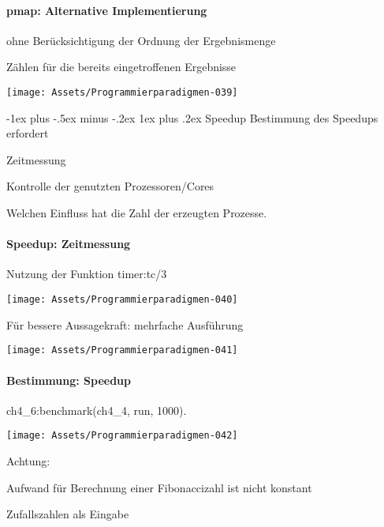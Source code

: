 \documentclass[10pt]{article}
\makeatletter
\renewcommand{\subsubsection}{\@startsection{subsubsection}{3}{0mm}%
                                {-1ex plus -.5ex minus -.2ex}%
                                {1ex plus .2ex}%
                                {\normalfont\small\bfseries}}
\makeatother
\begin{document}
\paragraph{pmap: Alternative Implementierung}
\begin{itemize*}
  \item ohne Berücksichtigung der Ordnung der Ergebnismenge
  \item Zählen für die bereits eingetroffenen Ergebnisse
\end{itemize*}
\begin{center}
  \texttt{[image: Assets/Programmierparadigmen-039]}
\end{center}

\subsubsection{Speedup}
Bestimmung des Speedups erfordert
\begin{itemize*}
  \item Zeitmessung
  \item Kontrolle der genutzten Prozessoren/Cores
\end{itemize*}
\color{orange} Welchen Einfluss hat die Zahl der erzeugten Prozesse. \color{black}

\paragraph{Speedup: Zeitmessung}
Nutzung der Funktion timer:tc/3
\begin{center}
  \texttt{[image: Assets/Programmierparadigmen-040]}
\end{center}
Für bessere Aussagekraft: mehrfache Ausführung
\begin{center}
  \texttt{[image: Assets/Programmierparadigmen-041]}
\end{center}

\paragraph{Bestimmung: Speedup}
ch4\_6:benchmark(ch4\_4, run, 1000).
\begin{center}
  \texttt{[image: Assets/Programmierparadigmen-042]}
\end{center}
\color{orange} Achtung: \color{black}
\begin{itemize*}
  \item Aufwand für Berechnung einer Fibonaccizahl ist nicht konstant
  \item Zufallszahlen als Eingabe
\end{itemize*}
\end{document}

